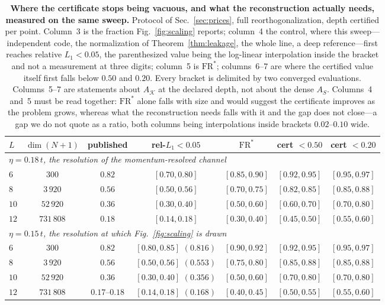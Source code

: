 \begin{table}[tp]\centering\small
\caption{\textbf{Where the certificate stops being vacuous, and what the reconstruction actually
needs, measured on the same sweep.} Protocol of Sec.~\ref{sec:prices}, full reorthogonalization, depth
certified per point. Column~3 is the fraction Fig.~\ref{fig:scaling} reports; column~4 the control,
where this sweep---independent code, the normalization of Theorem~\ref{thm:leakage}, the whole line,
a deep reference---first reaches relative $L_1<0.05$, the parenthesized value being the log-linear
interpolation inside the bracket and not a measurement at three digits; column~5 is
$\mathrm{FR}^{\ast}$; columns~6--7 are where the certified value itself first falls below $0.50$ and
$0.20$. Every bracket is delimited by two converged evaluations. Columns~5--7 are statements about $A_{\mathcal K}$ at the
declared depth, not about the dense $A_S$. Columns~4 and~5 must be read together: $\mathrm{FR}^{\ast}$
alone falls with size and would suggest the certificate improves as the problem grows, whereas what
the reconstruction needs falls with it and the gap does not close---a gap we do not quote as a ratio, both
columns being interpolations inside brackets $0.02$--$0.10$ wide.}\label{tab:thresholds}
\setlength{\tabcolsep}{4pt}
\begin{tabular}{lcccccc}
\toprule
$L$ & $\dim(N{+}1)$ & published & rel-$L_1<0.05$ & $\mathrm{FR}^{\ast}$ & cert $<0.50$ & cert $<0.20$\\
\midrule
\multicolumn{7}{l}{\emph{$\eta=0.18\,t$, the resolution of the momentum-resolved channel}}\\
$6$  & $300$     & $0.82$ & $[0.70,0.80]$ & $[0.85,0.90]$ & $[0.92,0.95]$ & $[0.95,0.97]$\\
$8$  & $3\,920$  & $0.56$ & $[0.50,0.56]$ & $[0.70,0.75]$ & $[0.82,0.85]$ & $[0.85,0.88]$\\
$10$ & $52\,920$ & $0.36$ & $[0.30,0.40]$ & $[0.50,0.60]$ & $[0.60,0.70]$ & $[0.70,0.80]$\\
$12$ & $731\,808$& $0.18$ & $[0.14,0.18]$ & $[0.30,0.40]$ & $[0.45,0.50]$ & $[0.55,0.60]$\\
\midrule
\multicolumn{7}{l}{\emph{$\eta=0.15\,t$, the resolution at which Fig.~\ref{fig:scaling} is drawn}}\\
$6$  & $300$     & $0.82$ & $[0.80,0.85]$ $(0.816)$ & $[0.90,0.92]$ & $[0.92,0.95]$ & $[0.95,0.97]$\\
$8$  & $3\,920$  & $0.56$ & $[0.50,0.56]$ $(0.553)$ & $[0.75,0.80]$ & $[0.85,0.88]$ & $[0.85,0.88]$\\
$10$ & $52\,920$ & $0.36$ & $[0.30,0.40]$ $(0.356)$ & $[0.50,0.60]$ & $[0.70,0.80]$ & $[0.70,0.80]$\\
$12$ & $731\,808$& $0.17$--$0.18$ & $[0.14,0.18]$ $(0.168)$ & $[0.40,0.45]$ & $[0.50,0.55]$ & $[0.55,0.60]$\\
\bottomrule
\end{tabular}
\end{table}

